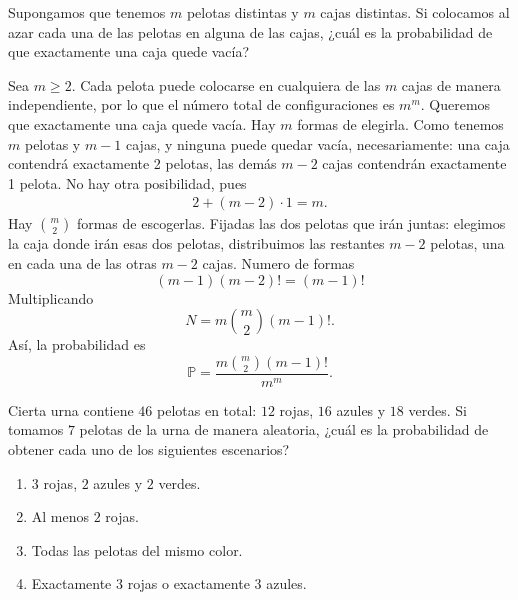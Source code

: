\message{ !name(tarea2.tex)}\documentclass[12pt,a4paper]{article}
\begin{document}
    \begin{mdframed}[style=mdbluebox,frametitle={Ejercicio 6}]
        Supongamos que tenemos $m$ pelotas distintas y $m$ cajas distintas. 
        Si colocamos al azar cada una de las pelotas en alguna de las cajas, 
        ¿cuál es la probabilidad de que exactamente una caja quede vacía?
    \end{mdframed}

    \begin{solucion}
        Sea $m\geq2$. Cada pelota puede colocarse en cualquiera de las $m$ cajas de manera independiente, por lo que
        el número total de configuraciones es $m^{m}$. Queremos que exactamente una caja quede vacía. Hay $m$
        formas de elegirla. Como tenemos $m$ pelotas y $m-1$ cajas, y ninguna puede quedar vacía, necesariamente:
        una caja contendrá exactamente 2 pelotas, las demás $m-2$ cajas contendrán exactamente 1 pelota.
        No hay otra posibilidad, pues
        \begin{align*}
            2+(m-2)\cdot1=m.
        \end{align*}
        Hay $\binom{m}{2}$ formas de escogerlas. Fijadas las dos pelotas que irán juntas: elegimos la caja donde irán esas
        dos pelotas, distribuimos las restantes $m-2$ pelotas, una en cada una de las otras $m-2$ cajas.
        Numero de formas
        \begin{equation*}
            (m-1)(m-2)!=(m-1)!
        \end{equation*}
        Multiplicando
        \begin{equation*}
            N=m\binom{m}{2}(m-1)!.
        \end{equation*}
        Así, la probabilidad es
        \begin{equation*}
            \mathbb{P}=\frac{m\binom{m}{2}(m-1)!}{m^{m}}.
        \end{equation*}
    \end{solucion}

    \begin{mdframed}[style=mdbluebox,frametitle={Ejercicio 7}]
        Cierta urna contiene $46$ pelotas en total: $12$ rojas, $16$ azules y $18$ verdes. 
        Si tomamos $7$ pelotas de la urna de manera aleatoria, 
        ¿cuál es la probabilidad de obtener cada uno de los siguientes escenarios?

        \begin{enumerate}
            \item[(a)] $3$ rojas, $2$ azules y $2$ verdes.
            \item[(b)] Al menos $2$ rojas.
            \item[(c)] Todas las pelotas del mismo color.
            \item[(d)] Exactamente $3$ rojas o exactamente $3$ azules.
        \end{enumerate}
    \end{mdframed}
\end{document}
